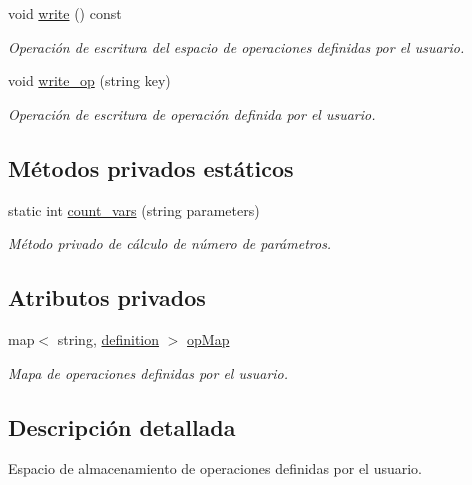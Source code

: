 \begin{DoxyCompactItemize}
void \hyperlink{class_operation_space_a20984ed564af09da9402980310f538c9}{write} () const 
\begin{DoxyCompactList}\small\item\em Operación de escritura del espacio de operaciones definidas por el usuario. \end{DoxyCompactList}\item 
void \hyperlink{class_operation_space_af671c739e788c44d4af703d4e0fd2284}{write\+\_\+op} (string key)
\begin{DoxyCompactList}\small\item\em Operación de escritura de operación definida por el usuario. \end{DoxyCompactList}\end{DoxyCompactItemize}
\subsection*{Métodos privados estáticos}
\begin{DoxyCompactItemize}
\item 
static int \hyperlink{class_operation_space_acec5b48678e494c0be7df4cc3bcc0768}{count\+\_\+vars} (string parameters)
\begin{DoxyCompactList}\small\item\em Método privado de cálculo de número de parámetros. \end{DoxyCompactList}\end{DoxyCompactItemize}
\subsection*{Atributos privados}
\begin{DoxyCompactItemize}
\item 
map$<$ string, \hyperlink{struct_operation_space_1_1definition}{definition} $>$ \hyperlink{class_operation_space_aae64cd370655d6b2fb3f2305c5a520a7}{op\+Map}
\begin{DoxyCompactList}\small\item\em Mapa de operaciones definidas por el usuario. \end{DoxyCompactList}\end{DoxyCompactItemize}


\subsection{Descripción detallada}
Espacio de almacenamiento de operaciones definidas por el usuario. 

